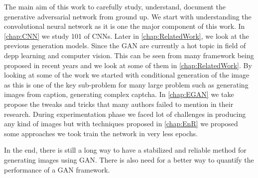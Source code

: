 \doublespacing
{}
\label{chap:Conclusion}

The main aim of this work to carefully study, understand, document the generative adversarial network from ground up. We start with understanding the  convolutional neural network as it is one the major component of this work. In \autoref{chap:CNN} we study 101 of CNNs. Later in \autoref{chap:RelatedWork}, we look at the previous generation models. Since the GAN are currently a hot topic in field of depp learning and computer vision. This can be seen from many framework being proposed in recent years and we look at some of them in \autoref{chap:RelatedWork}. By looking at some of the work we started with conditional generation of the image as this is one of the key sub-problem for many large problem such as generating images from caption, generating complex captcha. In \autoref{chap:EGAN} we take propose the  tweaks and tricks that many authors failed to mention in their research. During experimentation phase we faced lot of challenges in producing any kind of images but with techniques proposed in \autoref{chap:EnR} we proposed some approaches we took train the network in very less epochs.
\par
In the end, there is still a long way to have a stabilized and reliable method for generating images using GAN. There is also need for a better way to quantify the  performance of a GAN framework.